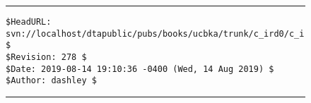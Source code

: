 
\noindent\begin{figure}[!b]
\noindent\rule[-0.25in]{\textwidth}{1pt}
\begin{tiny}
\begin{verbatim}
$HeadURL: svn://localhost/dtapublic/pubs/books/ucbka/trunk/c_ird0/c_ird0.tex $
$Revision: 278 $
$Date: 2019-08-14 19:10:36 -0400 (Wed, 14 Aug 2019) $
$Author: dashley $
\end{verbatim}
\end{tiny}
\noindent\rule[0.25in]{\textwidth}{1pt}
\end{figure}

% 

